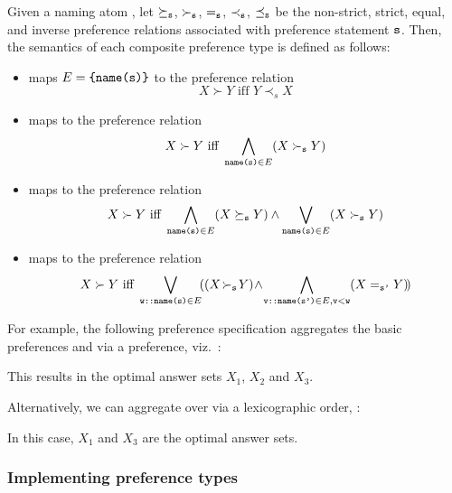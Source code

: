 Given a naming atom , 
let $\succeq_{\texttt{s}}$, $\succ_{\texttt{s}}$, $=_{\texttt{s}}$, $\prec_{\texttt{s}}$, $\preceq_{\texttt{s}}$ be the 
non-strict, strict, equal, and inverse preference relations associated with preference statement $\texttt{s}$.
Then, the semantics of each composite preference type is defined as follows:
\begin{itemize}
\item
{} maps $E=\texttt{\{name(s)\}}$ to the preference relation
\[
X \succ Y \text{ iff } Y \prec_s X
\]
\item 
{} maps  to the preference relation 
\[
X \succ Y \text{ iff } \bigwedge_{\texttt{name(s)}\in E}(X\succ_{\texttt{s}} Y)
\]
\item 
{} maps  to the preference relation 
\[
X \succ Y \text{ iff } \bigwedge_{\texttt{name(s)}\in E} (X\succeq_{\texttt{s}} Y)\wedge\bigvee_{\texttt{name(s)}\in E} (X\succ_{\texttt{s}} Y)
\]
\item
{} maps  to the preference relation 
\[
X \succ Y \text{ iff } \bigvee_{\texttt{w::name(s)}\in E}\!((X\!\succ_{\texttt{s}} \!Y)\!\wedge\!\bigwedge_{\texttt{v::name(s')}\in E,\texttt{v}<\texttt{w}}(X =_{\texttt{s'}} Y)\!)
\] 
\end{itemize} 

For example, the following preference specification aggregates the basic preferences  and 
via a  preference, viz.~: 
%

%
This results in the optimal answer sets $X_1$, $X_2$ and $X_3$.

Alternatively,
we can aggregate  over 
via a lexicographic order, :

In this case, $X_1$ and $X_3$ are the optimal answer sets.

\subsubsection{Implementing preference types}

